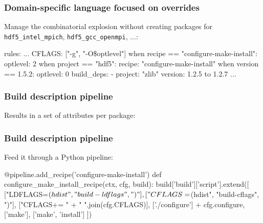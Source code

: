 \documentclass[sans,mathserif]{beamer}
\begin{document}
\begin{frame}[fragile]
\frametitle{Domain-specific language focused on overrides}

Manage the combinatorial explosion without creating
packages for {\tt hdf5\_intel\_mpich}, {\tt hdf5\_gcc\_openmpi}, ...:
{

\begin{semiverbatim}
rules:
  ...
  CFLAGS: ["-g", "-O\$optlevel"]
  when recipe == "configure-make-install":
    optlevel: 2
  when project == "hdf5":
    recipe: "configure-make-install"
    when version == 1.5.2:
      optlevel: 0
    build_deps:
      - project: "zlib"
        version: 1.2.5 to 1.2.7
  ...
\end{semiverbatim}
}
\end{frame}

\begin{frame}[fragile]
  \frametitle{Build description pipeline}


Results in a set of attributes per package:
{\small
{}
}
\end{frame}


\begin{frame}[fragile]
  \frametitle{Build description pipeline}

Feed it through a Python pipeline:
{\footnotesize

\begin{semiverbatim}
@pipeline.add\_recipe('configure-make-install')
def configure\_make\_install\_recipe(ctx, cfg, build):
    build['build']['script'].extend([
        ["LDFLAGS=$(hdist", "build-ldflags", ")"],
        ["CFLAGS=$(hdist", "build-cflags", ")"],
        ["CFLAGS+= " + " ".join(cfg.CFLAGS)],
        ['./configure'] + cfg.configure,
        ['make'],
        ['make', 'install']
        ])
\end{semiverbatim}
}

\end{frame}
\end{document}
